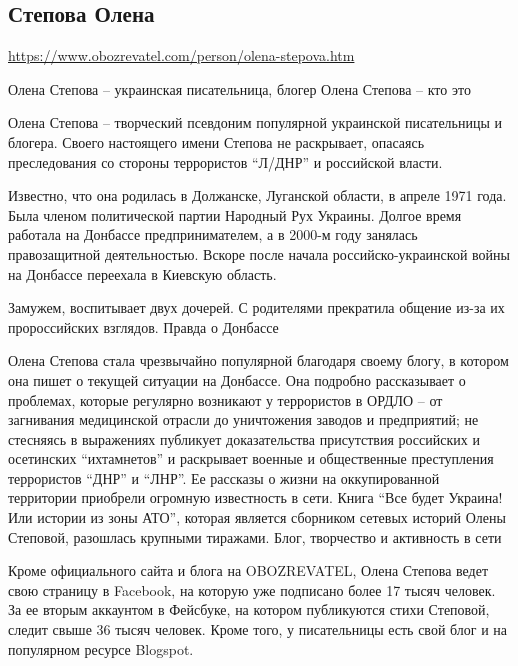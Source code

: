  
 
 
 
 

\subsection{Степова Олена}

\url{https://www.obozrevatel.com/person/olena-stepova.htm}

Олена Степова – украинская писательница, блогер
Олена Степова – кто это

Олена Степова – творческий псевдоним популярной украинской писательницы и блогера. Своего настоящего имени Степова не раскрывает, опасаясь преследования со стороны террористов “Л/ДНР” и российской власти.

Известно, что она родилась в Должанске, Луганской области, в апреле 1971 года. Была членом политической партии Народный Рух Украины. Долгое время работала на Донбассе предпринимателем, а в 2000-м году занялась правозащитной деятельностью. Вскоре после начала российско-украинской войны на Донбассе переехала в Киевскую область.

Замужем, воспитывает двух дочерей. С родителями прекратила общение из-за их пророссийских взглядов.
Правда о Донбассе

Олена Степова стала чрезвычайно популярной благодаря своему блогу, в котором она пишет о текущей ситуации на Донбассе. Она подробно рассказывает о проблемах, которые регулярно возникают у террористов в ОРДЛО – от загнивания медицинской отрасли до уничтожения заводов и предприятий; не стесняясь в выражениях публикует доказательства присутствия российских и осетинских “ихтамнетов” и раскрывает военные и общественные преступления террористов “ДНР” и “ЛНР”. Ее рассказы о жизни на оккупированной территории приобрели огромную известность в сети. Книга “Все будет Украина! Или истории из зоны АТО”, которая является сборником сетевых историй Олены Степовой, разошлась крупными тиражами.
Блог, творчество и активность в сети

Кроме официального сайта и блога на OBOZREVATEL, Олена Степова ведет свою страницу в Facebook, на которую уже подписано более 17 тысяч человек. За ее вторым аккаунтом в Фейсбуке, на котором публикуются стихи Степовой, следит свыше 36 тысяч человек. Кроме того, у писательницы есть свой блог и на популярном ресурсе Blogspot.

